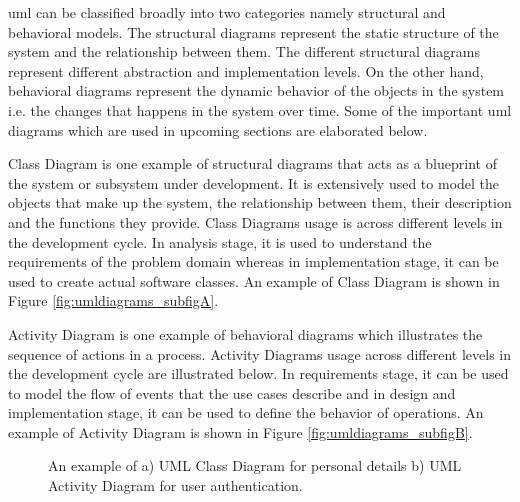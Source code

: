 \gls{uml} can be classified broadly into two categories namely structural and behavioral models. The structural diagrams represent the static structure of the system and the relationship between them. The different structural diagrams represent different abstraction and implementation levels. On the other hand, behavioral diagrams represent the dynamic behavior of the objects in the system i.e. the changes that happens in the system over time. Some of the important \gls{uml} diagrams which are used in upcoming sections are elaborated below.

Class Diagram is one example of structural diagrams that acts as a blueprint of the system or subsystem under development. It is extensively used to model the objects that make up the system, the relationship between them, their description and the functions they provide. Class Diagrams usage is across different levels in the development cycle. In analysis stage, it is used to understand the requirements of the problem domain whereas in implementation stage, it can be used to create actual software classes. An example of Class Diagram is shown in Figure \ref{fig:umldiagrams_subfigA}.

Activity Diagram is one example of behavioral diagrams which illustrates the sequence of actions in a process. Activity Diagrams usage across different levels in the development cycle are illustrated below. In requirements stage, it can be used to model the flow of events that the use cases describe and in design and implementation stage, it can be used to define the behavior of operations. An example of Activity Diagram is shown in Figure \ref{fig:umldiagrams_subfigB}.

\begin{figure}[htb!]
  \centering
	\caption{An example of a) UML Class Diagram for personal details b) UML Activity Diagram for user authentication.}
\label{fig:umldiagrams}
\end{figure}

